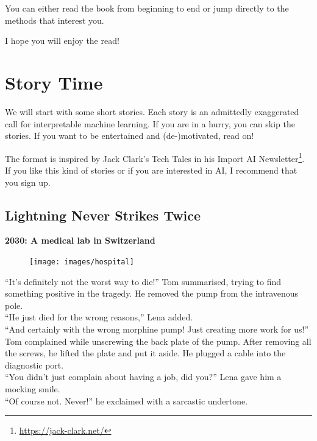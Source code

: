 \documentclass[
  12pt,
]{krantz}
\renewcommand{\href}[2]{#2\footnote{\url{#1}}}
\begin{document}
You can either read the book from beginning to end or jump directly to the methods that interest you.

I hope you will enjoy the read!

\newpage

\hypertarget{storytime}{%
\section{Story Time}\label{storytime}}

We will start with some short stories.
Each story is an admittedly exaggerated call for interpretable machine learning.
If you are in a hurry, you can skip the stories.
If you want to be entertained and (de-)motivated, read on!

The format is inspired by Jack Clark's Tech Tales in his \href{https://jack-clark.net/}{Import AI Newsletter}.
If you like this kind of stories or if you are interested in AI, I recommend that you sign up.

\hypertarget{lightning-never-strikes-twice}{%
\subsection*{Lightning Never Strikes Twice}\label{lightning-never-strikes-twice}}


\textbf{2030: A medical lab in Switzerland}

\begin{figure}

{\centering \texttt{[image: images/hospital]} 

}

\end{figure}

``It's definitely not the worst way to die!'' Tom summarised, trying to find something positive in the tragedy.
He removed the pump from the intravenous pole.\\
``He just died for the wrong reasons,'' Lena added.\\
``And certainly with the wrong morphine pump!
Just creating more work for us!'' Tom complained while unscrewing the back plate of the pump.
After removing all the screws, he lifted the plate and put it aside.
He plugged a cable into the diagnostic port.\\
``You didn't just complain about having a job, did you?'' Lena gave him a mocking smile.\\
``Of course not. Never!'' he exclaimed with a sarcastic undertone.
\end{document}
